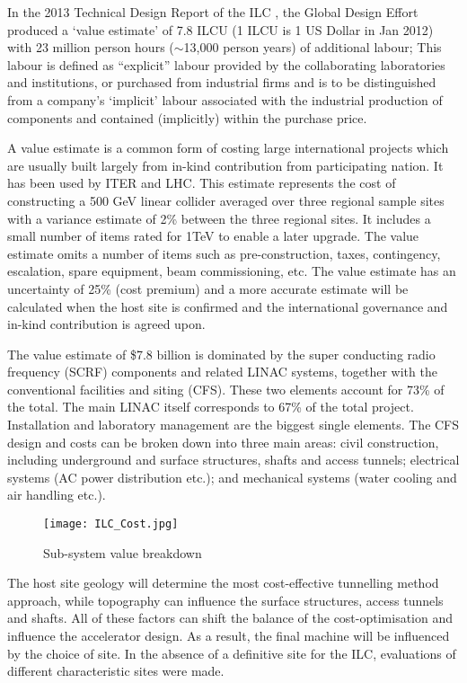 In the 2013 Technical Design Report of the ILC \cite{ILC:TechnicalDesignReport}, the Global Design Effort produced a `value estimate' of 7.8 ILCU (1 ILCU is 1 US Dollar in Jan 2012) with 23 million person hours ($\sim$13,000 person years) of additional labour; This labour is defined as “explicit” labour provided by the collaborating laboratories and institutions, or purchased from industrial firms and is to be distinguished from a company’s `implicit' labour associated with the industrial production of components and contained (implicitly) within the purchase price.  
 
A value estimate is a common form of costing large international projects which are usually built largely from in-kind contribution from participating nation. It has been used by ITER and LHC. This estimate represents the cost of constructing a 500 GeV linear collider averaged over three regional sample sites \textemdash with a variance estimate of 2\% between the three regional sites. It includes a small number of items rated for 1TeV to enable a later upgrade. The value estimate omits a number of items such as pre-construction, taxes, contingency, escalation, spare equipment, beam commissioning, etc. The value estimate has an uncertainty of 25\% (cost premium) and a more accurate estimate will be calculated when the host site is confirmed and the international governance and in-kind contribution is agreed upon.
 
The value estimate of \$7.8 billion is dominated by the super conducting radio frequency (SCRF) components and related LINAC systems, together with the conventional facilities and siting (CFS). These two elements account for 73\% of the total. The main LINAC itself corresponds to 67\% of the total project. Installation and laboratory management are the biggest single elements. The CFS design and costs can be broken down into three main areas: civil construction, including underground and surface structures, shafts and access tunnels; electrical systems (AC power distribution etc.); and mechanical systems (water cooling and air handling etc.).
 
\begin{figure}[!htb]
\centering
\texttt{[image: ILC\_Cost.jpg]}
\caption{Sub-system value breakdown \cite{ILC:TechnicalDesignReport}}
\end{figure}
 
The host site geology will determine the most cost-effective tunnelling method approach, while topography can influence the surface structures, access tunnels and shafts. All of these factors can shift the balance of the cost-optimisation and influence the accelerator design. As a result, the final machine will be influenced by the choice of site. In the absence of a definitive site for the ILC, evaluations of different characteristic sites were made. \cite{ILC:TechnicalDesignReport}
 
